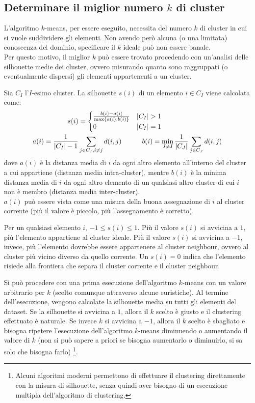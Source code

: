 \subsection{Determinare il miglior numero $k$ di cluster}
L'algoritmo $k$-means, per essere eseguito, necessita del numero $k$ di cluster in cui si vuole suddividere gli elementi.
Non avendo però alcuna (o una limitata) conoscenza del dominio, specificare il $k$ ideale può non essere banale.\\
Per questo motivo, il miglior $k$ può essere trovato procedendo con un'analisi delle silhouette medie dei cluster, ovvero misurando quanto sono raggruppati (o eventualmente dispersi) gli elementi appartenenti a un cluster.

Sia $C_I$ l'$I$-esimo cluster. La silhouette $s(i)$ di un elemento $i \in C_I$ viene calcolata come:
\begin{align*}
    s(i) &= \begin{cases}
        \frac{b(i)-a(i)}{\max\left\{a(i),b(i)\right\}} & |C_I| > 1\\
        0 & |C_I| = 1
    \end{cases}\\
    a(i) = \frac{1}{|C_I| - 1} &\sum\limits_{j \in C_I, i \neq j} d(i, j) \quad \quad \quad
    b(i) = \min\limits_{J \neq I} \frac{1}{|C_J|} \sum\limits_{j \in C_J} d(i,j)
\end{align*}
dove $a(i)$ è la distanza media di $i$ da ogni altro elemento all'interno del cluster a cui appartiene (distanza media intra-cluster), mentre $b(i)$ è la minima distanza media di $i$ da ogni altro elemento di un qualsiasi altro cluster di cui $i$ non è membro (distanza media inter-cluster).\\
$a(i)$ può essere vista come una misura della buona assegnazione di $i$ al cluster corrente (più il valore è piccolo, più l'assegnamento è corretto).

Per un qualsiasi elemento $i$, $-1 \le s(i) \le 1$. Più il valore $s(i)$ si avvicina a $1$, più l'elemento appartiene al cluster ideale. Più il valore $s(i)$ si avvicina a $-1$, invece, più l'elemento dovrebbe essere appartenere al cluster neighbour, ovvero al cluster più vicino diverso da quello corrente. Un $s(i) = 0$ indica che l'elemento risiede alla frontiera che separa il cluster corrente e il cluster neighbour. 

Si può procedere con una prima esecuzione dell'algoritmo $k$-means con un valore arbitrario per $k$ (scelto comunque attraverso alcune euristiche).
Al termine dell'esecuzione, vengono calcolate la silhouette media su tutti gli elementi del dataset. Se la silhouette si avvicina a $1$, allora il $k$ scelto è giusto e il clustering effettuato è naturale.
Se invece $k$ si avvicina a $-1$, allora il $k$ scelto è sbagliato e bisogna ripetere l'esecuzione dell'algoritmo $k$-means diminuendo o aumentando il valore di $k$ (non si può sapere a priori se bisogna aumentarlo o diminuirlo, si sa solo che bisogna farlo) \footnote{Alcuni algoritmi moderni permettono di effettuare il clustering direttamente con la misura di silhouette, senza quindi aver bisogno di un esecuzione multipla dell'algoritmo di clustering.}.


